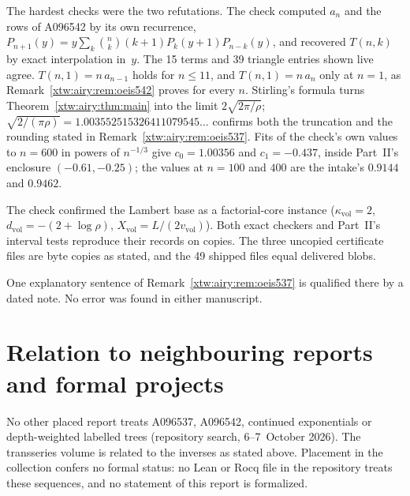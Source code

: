 \documentclass[11pt]{article}
\theoremstyle{remark}\newtheorem{remark}[theorem]{Remark}
\newcommand{\vol}{\mathrm{vol}}
\begin{document}
The hardest checks were the two refutations. The check computed $a_n$ and the
rows of A096542 by its own recurrence,
$P_{n+1}(y)=y\sum_k\binom nk(k+1)P_k(y+1)P_{n-k}(y)$, and recovered $T(n,k)$
by exact interpolation in~$y$. The 15 terms and 39 triangle entries shown
live agree. $T(n,1)=n\,a_{n-1}$ holds for $n\le11$, and $T(n,1)=n\,a_n$ only
at $n=1$, as Remark~\ref{xtw:airy:rem:oeis542} proves for every $n$. Stirling's
formula turns Theorem~\ref{xtw:airy:thm:main} into the limit $2\sqrt{2\pi/\rho}$;
$\sqrt{2/(\pi\rho)}=1.003552515326411079545\ldots$ confirms both the truncation
and the rounding stated in Remark~\ref{xtw:airy:rem:oeis537}. Fits of the
check's own values to $n=600$ in powers of $n^{-1/3}$ give $c_0=1.00356$ and
$c_1=-0.437$, inside Part~II's enclosure $(-0.61,-0.25)$; the values at $n=100$
and $400$ are the intake's $0.9144$ and $0.9462$.

The check confirmed the Lambert base as a factorial-core instance
($\kappa_\vol=2$, $d_\vol=-(2+\log\rho)$, $X_\vol=L/(2v_\vol)$). Both exact
checkers and Part~II's interval tests reproduce their records on copies. The
three uncopied certificate files are byte copies as stated, and the 49
shipped files equal delivered blobs.

One explanatory sentence of Remark~\ref{xtw:airy:rem:oeis537} is qualified
there by a dated note. No error was found in either manuscript.

\section*{Relation to neighbouring reports and formal projects}\label{xtw:sec:neighbours}
No other placed report treats A096537, A096542, continued exponentials or
depth-weighted labelled trees (repository search, 6--7~October 2026). The
transseries volume \cite{tsvol} is related to the inverses as stated above.
Placement in the collection confers no formal status: no Lean or Rocq file in
the repository treats these sequences, and no statement of this report is
formalized.
\clearpage
\end{document}
